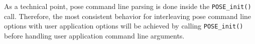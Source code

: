 As a technical point, pose command line parsing is done inside the
{\tt POSE\_init()} call.  Therefore, the most consistent behavior for
interleaving pose command line options with user application options
will be achieved by calling {\tt POSE\_init()} before handling user
application command line arguments.  
